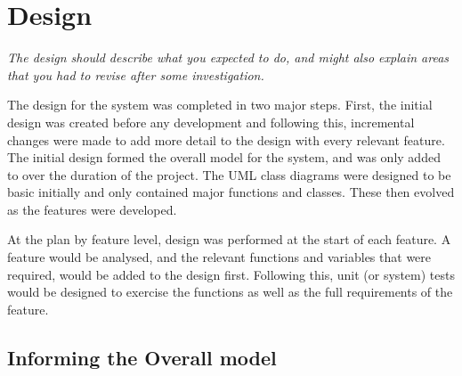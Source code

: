 \chapter{Design}

\textit{The design should describe what you expected to do, and might also explain areas that you had to revise after some investigation.}

The design for the system was completed in two major steps. First, the initial design was created before any development and following this, incremental changes were made to add  more detail to the design with every relevant feature. The initial design formed the overall model for the system, and was only added to over the duration of the project. The UML class diagrams were designed to be basic initially and only contained major functions and classes. These then evolved as the features were developed.

At the plan by feature level, design was performed at the start of each feature. A feature would be analysed, and the relevant functions and variables that were required, would be added to the design first. Following this, unit (or system) tests would be designed to exercise the functions as well as the full requirements of the feature.


\section{Informing the Overall model}
